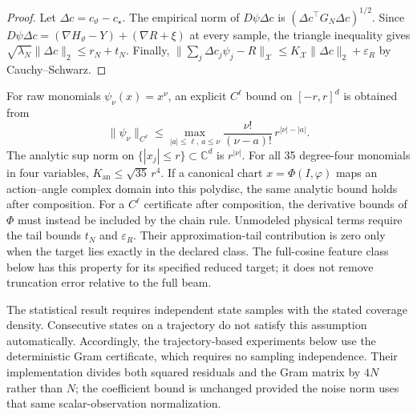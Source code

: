 \begin{proof}
Let $\Delta c=c_\vartheta-c_\star$.
The empirical norm of $D\psi\Delta c$ is
$(\Delta c^\top G_N\Delta c)^{1/2}$.
Since $D\psi\Delta c=(\nabla H_\vartheta-Y)+(\nabla R+\xi)$ at every
sample, the triangle inequality gives
$\sqrt{\lambda_N}\|\Delta c\|_2\leq r_N+t_N$.
Finally,
$\|\sum_j\Delta c_j\psi_j-R\|_{\mathcal X}
\leq K_{\mathcal X}\|\Delta c\|_2+\varepsilon_R$ by Cauchy--Schwarz.
\end{proof}

For raw monomials $\psi_\nu(x)=x^\nu$, an explicit $C^\ell$ bound on
$[-r,r]^d$ is obtained from
\[
 \|\psi_\nu\|_{C^\ell}
 \leq\max_{|a|\leq\ell,\,a\leq\nu}
      \frac{\nu!}{(\nu-a)!}\,r^{|\nu|-|a|}.
\]
The analytic sup norm on $\{|x_j|\leq r\}\subset\mathbb C^d$ is
$r^{|\nu|}$. For all 35 degree-four monomials in four variables,
$K_{\mathrm{an}}\leq\sqrt{35}\,r^4$.
If a canonical chart $x=\Phi(I,\varphi)$ maps an action--angle complex
domain into this polydisc, the same analytic bound holds after composition.
For a $C^\ell$ certificate after composition, the derivative bounds of
$\Phi$ must instead be included by the chain rule.
Unmodeled physical terms require the tail bounds $t_N$ and $\varepsilon_R$.
Their approximation-tail contribution is zero only when the target lies
exactly in the declared class. The full-cosine feature class below has
this property for its specified reduced target; it does not remove
truncation error relative to the full beam.

The statistical result requires independent state samples with the stated
coverage density. Consecutive states on a trajectory do not satisfy this
assumption automatically. Accordingly, the trajectory-based experiments
below use the deterministic Gram certificate, which requires no sampling
independence. Their implementation divides both squared residuals and the
Gram matrix by $4N$ rather than $N$; the coefficient bound is unchanged
provided the noise norm uses that same scalar-observation normalization.

